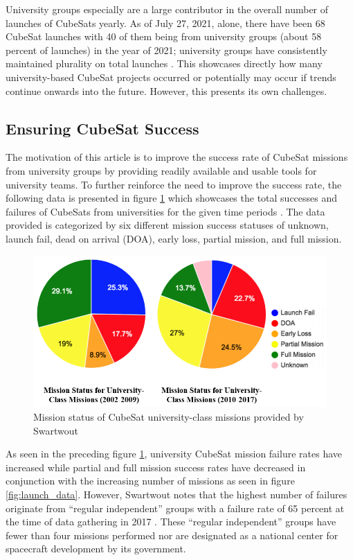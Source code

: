 \documentclass[journal,article,submit,pdftex,moreauthors]{Definitions/mdpi}
\begin{document}
University groups especially are a large contributor in the overall number of launches of CubeSats yearly.  As of July 27, 2021, alone, there have been 68 CubeSat launches with 40 of them being from university groups (about 58 percent of launches) in the year of 2021; university groups have consistently maintained plurality on total launches \cite{swartwout_data}.  This showcases directly how many university-based CubeSat projects occurred or potentially may occur if trends continue onwards into the future.  However, this presents its own challenges.

\subsection{Ensuring CubeSat Success}
The motivation of this article is to improve the success rate of CubeSat missions from university groups by providing readily available and usable tools for university teams.  To further reinforce the need to improve the success rate, the following data is presented in figure \ref{fig:mission_status} which showcases the total successes and failures of CubeSats from universities for the given time periods \cite{reliving_24}.  The data provided is categorized by six different mission success statuses of unknown, launch fail, dead on arrival (DOA), early loss, partial mission, and full mission.

\begin{figure}[H]
    \includegraphics[width=10.5 cm]{assets/mission_status.png}
    \caption{Mission status of CubeSat university-class missions provided by Swartwout \cite{reliving_24}}
	\label{fig:mission_status}
    \end{figure}
	\noindent   
\unskip

As seen in the preceding figure \ref{fig:mission_status}, university CubeSat mission failure rates have increased while partial and full mission success rates have decreased in conjunction with the increasing number of missions as seen in figure \ref{fig:launch_data}.  However, Swartwout notes that the highest number of failures originate from “regular independent” groups with a failure rate of 65 percent at the time of data gathering in 2017 \cite{reliving_24}.  These “regular independent” groups have fewer than four missions performed nor are designated as a national center for spacecraft development by its government. 
\end{document}

